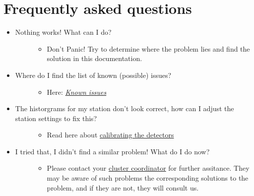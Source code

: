 \documentclass[a4paper,11pt,english]{sphinxmanual}
\begin{document}
\chapter{Frequently asked questions}
\label{faq::doc}\label{faq:frequently-asked-questions}\begin{itemize}
\item {} \begin{description}
\item[{Nothing works! What can I do?}] \leavevmode\begin{itemize}
\item {} 
Don't Panic! Try to determine where the problem lies and find the solution in this documentation.

\end{itemize}

\end{description}

\item {} \begin{description}
\item[{Where do I find the list of known (possible) issues?}] \leavevmode\begin{itemize}
\item {} 
Here: {\hyperref[known-issues::doc]{\emph{Known issues}}}

\end{itemize}

\end{description}

\item {} \begin{description}
\item[{The historgrams for my station don't look correct, how can I adjust the station settings to fix this?}] \leavevmode\begin{itemize}
\item {} 
Read here about \href{http://docs.hisparc.nl/station-software/doc/configuratie.html\#calibratie-van-de-detector}{calibrating the detectors}

\end{itemize}

\end{description}

\item {} \begin{description}
\item[{I tried that, I didn't find a similar problem! What do I do now?}] \leavevmode\begin{itemize}
\item {} 
Please contact your \href{http://www.hisparc.nl/over-hisparc/organisatie/}{cluster coordinator}  for further assitance. They may be aware of such problems the corresponding solutions to the problem, and if they are not, they will consult us.


\end{itemize}
\end{description}
\end{itemize}
\end{document}
